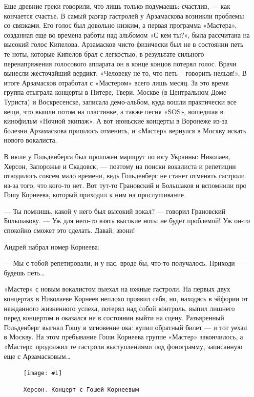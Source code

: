 \documentclass[16pt,a5paper]{book}
\newcommand{\myincludegraphics}[1]{\texttt{[image: \#1]}}
\begin{document}
Еще древние греки говорили, что лишь только подумаешь: счастлив, — как кончается счастье. В самый разгар гастролей у
Арзамаскова возникли проблемы со связками. Его голос был довольно низким, а первая программа «Мастера», созданная еще во
времена работы над альбомом «С кем ты?», была рассчитана на высокий голос Кипелова. Арзамасков чисто физически был не в
состоянии петь те ноты, которые Кипелов брал с легкостью, в результате сильного перенапряжения голосового аппарата он в
конце концов потерял голос. Врачи вынесли жесточайший вердикт: «Человеку не то, что петь – говорить нельзя!». В итоге
Арзамасков отработал с «Мастером» всего лишь месяц. За это время группа отыграла концерты в Питере, Твери, Москве (в
Центральном Доме Туриста) и Воскресенске, записала демо-альбом, куда вошли практически все вещи, что вышли потом на
пластинке, а также песня «SOS», вошедшая в кинофильм «Ночной экипаж». А вот июньские концерты в Воронеже из-за болезни
Арзамаскова пришлось отменить, и «Мастер» вернулся в Москву искать нового вокалиста.

В июле у Гольденберга был проложен маршрут по югу Украины: Николаев, Херсон, Запорожье и Скадовск, — поэтому на поиски
вокалиста и репетиции отводилось совсем мало времени, ведь Гольденберг не станет отменять гастроли из-за того, что
кого-то нет. Вот тут-то Грановский и Большаков и вспомнили про Гошу Корнеева, который приходил к ним на прослушивание.

— Ты помнишь, какой у него был высокий вокал? — говорил Грановский Большакову. — Уж для него-то взять высокие ноты не
будет проблемой! Уж он-то спокойно сможет это сделать. Давай, звони!

Андрей набрал номер Корнеева:

— Мы с тобой репетировали, и у нас, вроде бы, что-то получалось. Приходи — будешь петь\ldots

«Мастер» с новым вокалистом выехал на южные гастроли. На первых двух концертах в Николаеве Корнеев неплохо проявил себя,
но, находясь в эйфории от нежданного жизненного успеха, потерял над собой контроль, выпил лишнего перед концертом и
оказался не в состоянии выйти на сцену. Разъяренный Гольденберг выгнал Гошу в мгновение ока: купил обратный билет — и
тот уехал в Москву. На этом пребывание Гоши Корнеева группе «Мастер» закончилось, а «Мастер» продолжил те гастроли
выступлениями под фонограмму, записанную еще с Арзамасковым\ldots

\begin{figure}[h]
    \centering
    \myincludegraphics{Image19}
    \caption{\texttt{Херсон. Концерт с Гошей Корнеевым}}
\end{figure}
\end{document}
